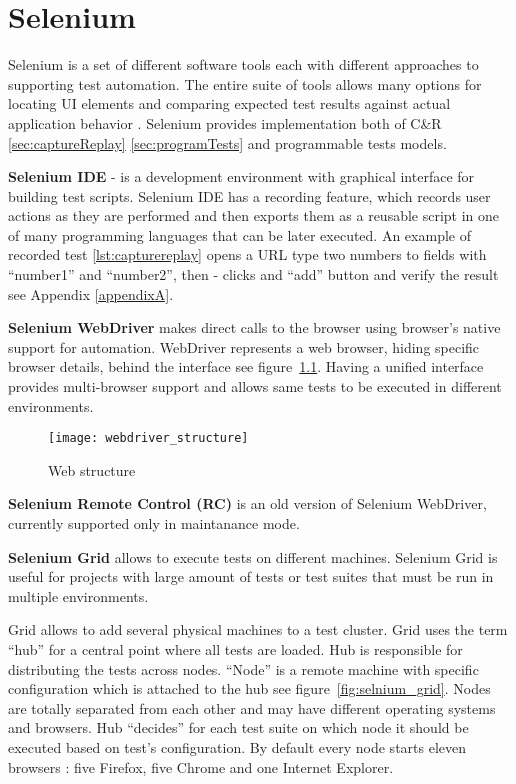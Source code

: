 	\chapter {Selenium}
	\label{ch:selenium}
      Selenium is a set of different software tools each with different
      approaches to supporting test automation. The entire suite of tools allows
      many options for locating UI elements and comparing expected test results
       against actual application behavior \cite{seleniumSite}.
       Selenium provides implementation both of C\&R \ref{sec:captureReplay}
       \ref{sec:programTests} and programmable tests models.  
       
       \textbf{Selenium IDE} - is a development environment with graphical
       interface for building test scripts.
		Selenium IDE has a recording feature,  which records user actions as they are
		performed and then exports them as a reusable script in one of many programming languages that can be later executed.
		An example of recorded test \ref{lst:capturereplay} opens a URL type two
		numbers to fields with ``number1'' and ``number2'', then -
		clicks and ``add'' button and verify the result see Appendix \ref{appendixA}.
		
       \textbf{Selenium  WebDriver} makes direct calls to the browser using browser's native support for automation. WebDriver represents a web browser, hiding specific browser details, behind the interface see
       figure~\ref{fig:webdriver}. Having a unified interface provides
       multi-browser support and allows same tests to be executed in different
       environments.
       
	  \begin{figure}
	  \centering
  		\texttt{[image: webdriver\_structure]}
  		\caption{Web structure}
  		\label{fig:webdriver}
		\end{figure}
		
    	\textbf{Selenium Remote Control (RC)} is an old version of Selenium
    	WebDriver, currently supported only in maintanance mode.
       
       \textbf{Selenium Grid} allows to execute tests on different machines.
       Selenium Grid is useful for projects with large amount of tests or test
       suites that must be run in multiple environments.
       
		Grid allows to add several physical machines to a test cluster. Grid uses the
		term ``hub'' for a central point where all tests are loaded. Hub is responsible
		for distributing the tests across nodes. ``Node'' is  a remote machine with
		specific configuration which is attached to the hub see
		figure~\ref{fig:selnium_grid}. Nodes are totally separated from each other and
		may have different operating systems and browsers. Hub ``decides''
		for each test suite on which node it should be executed based on test's configuration.
		By default every node starts eleven browsers : five Firefox, five Chrome and
		one Internet Explorer.
		
